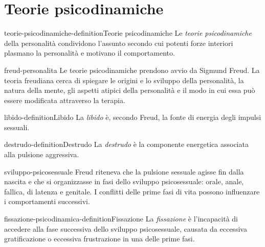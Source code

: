 \documentclass[preview]{standalone}
\begin{document}
\genpage

\section{Teorie psicodinamiche}

\begin{snippetdefinition}{teorie-psicodinamiche-definition}{Teorie psicodinamiche}
    Le \emph{teorie psicodinamiche} della personalità condividono l'assunto
    secondo cui potenti forze interiori plasmano la personalità e motivano il
    comportamento.
\end{snippetdefinition}

\begin{snippet}{freud-personalita}
    Le teorie psicodinamiche prendono avvio da Sigmund Freud. La teoria
    freudiana cerca di spiegare le origini e lo sviluppo della personalità, la
    natura della mente, gli aspetti atipici della personalità e il modo in cui
    essa può essere modificata attraverso la terapia.
\end{snippet}

\begin{snippetdefinition}{libido-definition}{Libido}
    La \emph{libido} è, secondo Freud, la fonte di energia degli impulsi
    sessuali.
\end{snippetdefinition}

\begin{snippetdefinition}{destrudo-definition}{Destrudo}
    La \emph{destrudo} è la componente energetica associata alla pulsione
    aggressiva.
\end{snippetdefinition}

\begin{snippet}{sviluppo-psicosessuale}
    Freud riteneva che la pulsione sessuale agisse fin dalla nascita e che si
    organizzasse in fasi dello sviluppo psicosessuale: orale, anale, fallica, di
    latenza e genitale. I conflitti delle prime fasi di vita possono influenzare
    i comportamenti successivi.
\end{snippet}

\begin{snippetdefinition}{fissazione-psicodinamica-definition}{Fissazione}
    La \emph{fissazione} è l'incapacità di accedere alla fase successiva dello
    sviluppo psicosessuale, causata da eccessiva gratificazione o eccessiva
    frustrazione in una delle prime fasi.
\end{snippetdefinition}
\end{document}
